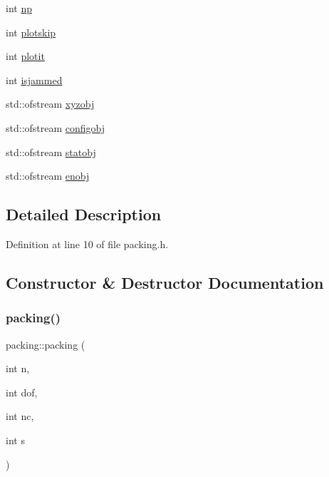 \begin{DoxyCompactItemize}
int \mbox{\hyperlink{classpacking_a2e20ad3bfc90e5c328dddd7da34291e1}{np}}
\item 
int \mbox{\hyperlink{classpacking_aa88ec1647a3bdcf9c3cc03ea03257c1b}{plotskip}}
\item 
int \mbox{\hyperlink{classpacking_a495864a18a5eeef957d7a1bc3d3eb2bd}{plotit}}
\item 
int \mbox{\hyperlink{classpacking_a8a79180aa5d7bd8faa6d048f036f5d2b}{isjammed}}
\item 
std\+::ofstream \mbox{\hyperlink{classpacking_a8c37b117034cced906a5232358752725}{xyzobj}}
\item 
std\+::ofstream \mbox{\hyperlink{classpacking_af156dc6a748d6330d8d058d7b623f33e}{configobj}}
\item 
std\+::ofstream \mbox{\hyperlink{classpacking_a7d70ed77edfe21649b824f01d26432d0}{statobj}}
\item 
std\+::ofstream \mbox{\hyperlink{classpacking_acc65e17d00c4ae7ed3efee0da9693144}{enobj}}
\end{DoxyCompactItemize}


\subsection{Detailed Description}


Definition at line 10 of file packing.\+h.



\subsection{Constructor \& Destructor Documentation}
\mbox{\label{classpacking_aec1b63190de5c8e69e47a06bfb7db0d5}} 
\subsubsection{\texorpdfstring{packing()}{packing()}\hspace{0.1cm}{\footnotesize\ttfamily [1/4]}}
{\footnotesize\ttfamily packing\+::packing (\begin{DoxyParamCaption}\item[{int}]{n,  }\item[{int}]{dof,  }\item[{int}]{nc,  }\item[{int}]{s }\end{DoxyParamCaption})}



